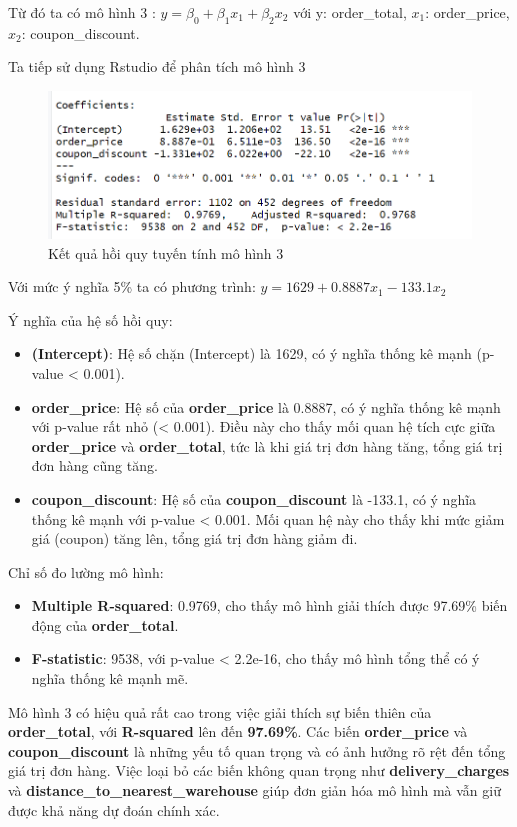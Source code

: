Từ đó ta có mô hình 3 : $y= \beta_0 + \beta_1x_1 + \beta_2x_2$ với y: order\_total, $x_1$: order\_price, $x_2$: coupon\_discount.

Ta tiếp sử dụng Rstudio để phân tích mô hình 3
\begin{figure}[H]
  \centering
  \includegraphics[width=0.7\linewidth]{graphics/5.5.4.png}
  \caption{Kết quả hồi quy tuyến tính mô hình 3 }
\end{figure}

Với mức ý nghĩa 5\% ta có phương trình: $y= 1629 + 0.8887x_1 - 133.1 x_2$

Ý nghĩa của hệ số hồi quy:
\begin{itemize}
\item\textbf{(Intercept)}: Hệ số chặn (Intercept) là 1629, có ý nghĩa thống kê mạnh (p-value < 0.001).
\item\textbf{order\_price}: Hệ số của \textbf{order\_price} là 0.8887, có ý nghĩa thống kê mạnh với p-value rất nhỏ (< 0.001). Điều này cho thấy mối quan hệ tích cực giữa \textbf{order\_price} và \textbf{order\_total}, tức là khi giá trị đơn hàng tăng, tổng giá trị đơn hàng cũng tăng.
\item\textbf{coupon\_discount}: Hệ số của \textbf{coupon\_discount} là -133.1, có ý nghĩa thống kê mạnh với p-value < 0.001. Mối quan hệ này cho thấy khi mức giảm giá (coupon) tăng lên, tổng giá trị đơn hàng giảm đi.
\end{itemize}

Chỉ số đo lường mô hình:

\begin{itemize}
\item\textbf{Multiple R-squared}: 0.9769, cho thấy mô hình giải thích được 97.69\% biến động của \textbf{order\_total}.
\item\textbf{F-statistic}: 9538, với p-value < 2.2e-16, cho thấy mô hình tổng thể có ý nghĩa thống kê mạnh mẽ.
\end{itemize}

Mô hình 3 có hiệu quả rất cao trong việc giải thích sự biến thiên của \textbf{order\_total}, với \textbf{R-squared} lên đến \textbf{97.69\%}. Các biến \textbf{order\_price} và \textbf{coupon\_discount} là những yếu tố quan trọng và có ảnh hưởng rõ rệt đến tổng giá trị đơn hàng. Việc loại bỏ các biến không quan trọng như \textbf{delivery\_charges} và \textbf{distance\_to\_nearest\_warehouse} giúp đơn giản hóa mô hình mà vẫn giữ được khả năng dự đoán chính xác.

